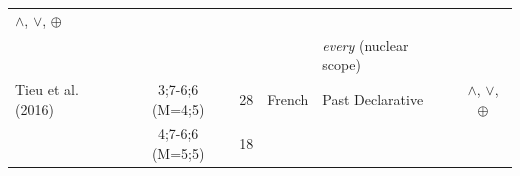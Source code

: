 \documentclass[oneside]{report}
\theoremstyle{definition}
\theoremstyle{definition}
\theoremstyle{definition}
\theoremstyle{remark}
\begin{document}
\begin{longtable}[]{@{}lccclc@{}}
\begin{minipage}[t]{0.13\columnwidth}
\(\land\), \(\lor\), \(\oplus\)\strut
\end{minipage}\tabularnewline
\begin{minipage}[t]{0.23\columnwidth}\raggedright\strut
\strut
\end{minipage} & \begin{minipage}[t]{0.07\columnwidth}\centering\strut
\strut
\end{minipage} & \begin{minipage}[t]{0.05\columnwidth}\centering\strut
\strut
\end{minipage} & \begin{minipage}[t]{0.10\columnwidth}\centering\strut
\strut
\end{minipage} & \begin{minipage}[t]{0.25\columnwidth}\raggedright\strut
\emph{every} (nuclear scope)\strut
\end{minipage} & \begin{minipage}[t]{0.13\columnwidth}\centering\strut
\strut
\end{minipage}\tabularnewline
\begin{minipage}[t]{0.23\columnwidth}\raggedright\strut
Tieu et al. (2016)\strut
\end{minipage} & \begin{minipage}[t]{0.07\columnwidth}\centering\strut
3;7-6;6 (M=4;5)\strut
\end{minipage} & \begin{minipage}[t]{0.05\columnwidth}\centering\strut
28\strut
\end{minipage} & \begin{minipage}[t]{0.10\columnwidth}\centering\strut
French\strut
\end{minipage} & \begin{minipage}[t]{0.25\columnwidth}\raggedright\strut
Past Declarative\strut
\end{minipage} & \begin{minipage}[t]{0.13\columnwidth}\centering\strut
\(\land\), \(\lor\), \(\oplus\)\strut
\end{minipage}\tabularnewline
\begin{minipage}[t]{0.23\columnwidth}\raggedright\strut
\strut
\end{minipage} & \begin{minipage}[t]{0.07\columnwidth}\centering\strut
4;7-6;6 (M=5;5)\strut
\end{minipage} & \begin{minipage}[t]{0.05\columnwidth}\centering\strut
18\strut
\end{minipage} & \begin{minipage}[t]{0.10\columnwidth}\centering\strut

\end{minipage}
\end{longtable}
\end{document}
